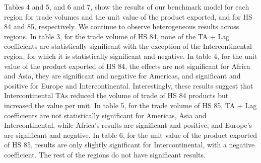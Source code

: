 Tables 4 and 5, and 6 and 7, show the results of our benchmark model for
each region for trade volumes and the unit value of the product
exported, and for HS 84 and 85, respectively. We continue to observe
heterogeneous results across regions. In table 3, for the trade volume
of HS 84, none of the TA + Lag coefficients are statistically
significant with the exception of the Intercontinental region, for which
it is statistically significant and negative. In table 4, for the unit
value of the product exported of HS 84, the effects are not significant
for Africa and Asia, they are significant and negative for Americas, and
significant and positive for Europe and Intercontinental. Interestingly,
these results suggest that Intercontinental TAs reduced the volume of
trade of HS 84 products but increased the value per unit. In table 5,
for the trade volume of HS 85, TA + Lag coefficients are not
statistically significant for Americas, Asia and Intercontinental, while
Africa's results are significant and positive, and Europe's are
significant and negative. In table 6, for the unit value of the product
exported of HS 85, results are only slightly significant for
Intercontinental, with a negative coefficient. The rest of the regions
do not have significant results.

